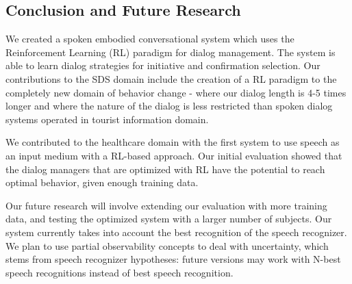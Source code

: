 \begin{sloppy}
\section{Conclusion and Future Research}

We created a spoken embodied conversational system which uses the Reinforcement Learning (RL) paradigm for dialog management. The system is able to learn dialog strategies for initiative and confirmation selection. Our contributions to the SDS domain include the creation of a RL paradigm to the completely new domain of behavior change - where our dialog length is 4-5 times longer and where the nature of the dialog is less restricted than spoken dialog systems operated in tourist information domain.

We contributed to the healthcare domain with the first system to use speech as an input medium with a RL-based approach. Our initial evaluation showed that the dialog managers that are optimized with RL have the potential to reach optimal behavior, given enough training data. 
 
Our future research will involve extending our evaluation with more training data, and testing the optimized system with a larger number of subjects. Our system currently takes into account the best recognition of the speech recognizer.  We plan to use partial observability concepts to deal with uncertainty, which stems from speech recognizer hypotheses: future versions may work with N-best speech recognitions instead of best speech recognition. 





\end{sloppy}


